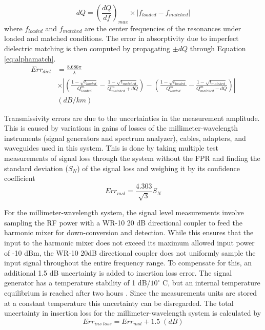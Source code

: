 \begin{equation}
dQ = \left(\frac{dQ}{df} \right)_{max} \times |f_{loaded} - f_{matched}|
\end{equation}
where $f_{loaded}$ and $ f_{matched}$ are the center frequencies of the resonances under loaded and matched conditions. The error in absorptivity due to imperfect dielectric matching is then computed by propagating $\pm dQ$ through Equation \ref{eq:alphamatch}.
\begin{equation}
\begin{split}
Err_{diel} &= \frac{8.686 \pi}{\lambda} 
\\ &\times \left| \left( \frac{1-\sqrt{t_{loaded}}}{Q^m_{loaded}} - \frac{1-\sqrt{t_{matched}}}{Q^m_{matched} + dQ} \right) - \left( \frac{1-\sqrt{t_{loaded}}}{Q^m_{loaded}} - \frac{1-\sqrt{t_{matched}}}{Q^m_{matched} - dQ} \right) \right|\\
 &(dB/km)
\end{split}
\end{equation}

Transmissivity errors are due to the uncertainties in the measurement amplitude. This is caused by variations in gains of losses of the millimeter-wavelength instruments (signal generators and spectrum analyzer), cables, adapters, and waveguides used in this system. This is done by taking multiple test measurements of signal loss through the system without the FPR and finding the standard deviation ($S_N$) of the signal loss and weighing it by its confidence coefficient
\begin{equation}
Err_{msl} = \frac{4.303}{\sqrt{3}}S_N
\end{equation}

For the millimeter-wavelength system, the signal level measurements involve sampling the RF power with a WR-10 20 dB directional coupler to feed the harmonic mixer for down-conversion and detection. While this ensures that the input to the harmonic mixer does not exceed its maximum allowed input power of -10 dBm, the WR-10 20dB directional coupler does not uniformly sample the input signal throughout the entire frequency range. To compensate for this, an additional 1.5 dB uncertainty is added to insertion loss error. The signal generator has a temperature stability of 1 dB/$10^\circ$ C, but an internal temperature equilibrium is reached after two hours \cite{Hewlett-Packard}. Since the measurements units are stored at a constant temperature this uncertainty can be disregarded. The total uncertainty in insertion loss for the millimeter-wavelength system is calculated by
\begin{equation}
Err_{ins\;loss} = Err_{msl} +1.5\;(dB)
\end{equation}

